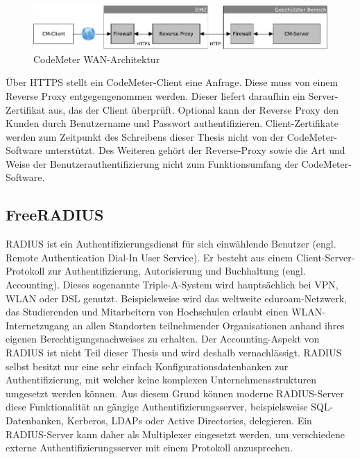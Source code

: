 \documentclass[11pt,a4paper]{report}
\begin{document}
\begin{figure}[htbp]
\centering
\includegraphics[scale=0.9]{images/design_wan_codemeter.pdf}
\caption{CodeMeter WAN-Architektur}
\label{fig:radius_access}
\end{figure}

Über HTTPS stellt ein CodeMeter-Client eine Anfrage. Diese muss von einem Reverse Proxy entgegengenommen werden. Dieser liefert daraufhin ein Server-Zertifikat aus, das der Client überprüft. Optional kann der Reverse Proxy den Kunden durch Benutzername und Passwort authentifizieren. Client-Zertifikate werden zum Zeitpunkt des Schreibens dieser Thesis nicht von der CodeMeter-Software unterstützt. Des Weiteren gehört der Reverse-Proxy sowie die Art und Weise der Benutzerauthentifizierung nicht zum Funktionsumfang der CodeMeter-Software. 

\subsection{FreeRADIUS}

RADIUS ist ein Authentifizierungsdienst für sich einwählende Benutzer (engl. Remote Authentication Dial-In User Service). Er besteht aus einem Client-Server-Protokoll zur Authentifizierung, Autorisierung und Buchhaltung (engl. Accounting). Dieses sogenannte Triple-A-System wird hauptsächlich bei VPN, WLAN oder DSL genutzt. Beispielsweise wird das weltweite eduroam-Netzwerk, das Studierenden und Mitarbeitern von Hochschulen erlaubt einen WLAN-Internetzugang an allen Standorten teilnehmender Organisationen anhand ihres eigenen Berechtigungsnachweises zu erhalten. Der Accounting-Aspekt von RADIUS ist nicht Teil dieser Thesis und wird deshalb vernachlässigt. RADIUS selbst besitzt nur eine sehr einfach Konfigurationsdatenbanken zur Authentifizierung, mit welcher keine komplexen Unternehmensstrukturen umgesetzt werden können. Aus diesem Grund können moderne RADIUS-Server diese Funktionalität an gängige Authentifizierungsserver, beispielsweise SQL-Datenbanken, Kerberos, LDAPs oder Active Directories, delegieren. Ein RADIUS-Server kann daher als Multiplexer eingesetzt werden, um verschiedene externe Authentifizierungsserver mit einem Protokoll anzusprechen.
\end{document}
